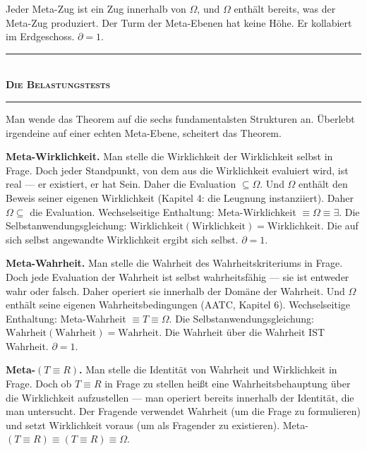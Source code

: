 \documentclass[10pt, openany, oneside]{book}
\renewcommand{\normalsize}{\fontsize{10}{13}\selectfont}
\begin{document}
\vspace{0.8em}

\noindent Jeder Meta-Zug ist ein Zug innerhalb von $\Omega$, und $\Omega$ enthält bereits, was der Meta-Zug produziert. Der Turm der Meta-Ebenen hat keine Höhe. Er kollabiert im Erdgeschoss. $\partial = 1$.

\vspace{1.5em}


\begin{center}
    \rule{0.3\textwidth}{0.4pt}\\[0.5em]
    {\normalsize\bfseries\scshape Die Belastungstests}\\[0.3em]
    \rule{0.3\textwidth}{0.4pt}
\end{center}

\vspace{1em}

\noindent Man wende das Theorem auf die sechs fundamentalsten Strukturen an. Überlebt irgendeine auf einer echten Meta-Ebene, scheitert das Theorem.

\textbf{Meta-Wirklichkeit.} Man stelle die Wirklichkeit der Wirklichkeit selbst in Frage. Doch jeder Standpunkt, von dem aus die Wirklichkeit evaluiert wird, ist real --- er existiert, er hat Sein. Daher die Evaluation $\subseteq \Omega$. Und $\Omega$ enthält den Beweis seiner eigenen Wirklichkeit (Kapitel 4: die Leugnung instanziiert). Daher $\Omega \subseteq$ die Evaluation. Wechselseitige Enthaltung: Meta-Wirklichkeit $\equiv \Omega \equiv \exists$. Die Selbstanwendungsgleichung: $\text{Wirklichkeit}(\text{Wirklichkeit}) = \text{Wirklichkeit}$. Die auf sich selbst angewandte Wirklichkeit ergibt sich selbst. $\partial = 1$.

\textbf{Meta-Wahrheit.} Man stelle die Wahrheit des Wahrheitskriteriums in Frage. Doch jede Evaluation der Wahrheit ist selbst wahrheitsfähig --- sie ist entweder wahr oder falsch. Daher operiert sie innerhalb der Domäne der Wahrheit. Und $\Omega$ enthält seine eigenen Wahrheitsbedingungen (AATC, Kapitel 6). Wechselseitige Enthaltung: Meta-Wahrheit $\equiv T \equiv \Omega$. Die Selbstanwendungsgleichung: $\text{Wahrheit}(\text{Wahrheit}) = \text{Wahrheit}$. Die Wahrheit über die Wahrheit IST Wahrheit. $\partial = 1$.

\textbf{Meta-$(T \equiv R)$.} Man stelle die Identität von Wahrheit und Wirklichkeit in Frage. Doch ob $T \equiv R$ in Frage zu stellen heißt eine Wahrheitsbehauptung über die Wirklichkeit aufzustellen --- man operiert bereits innerhalb der Identität, die man untersucht. Der Fragende verwendet Wahrheit (um die Frage zu formulieren) und setzt Wirklichkeit voraus (um als Fragender zu existieren). Meta-$(T \equiv R) \equiv (T \equiv R) \equiv \Omega$.
\end{document}
